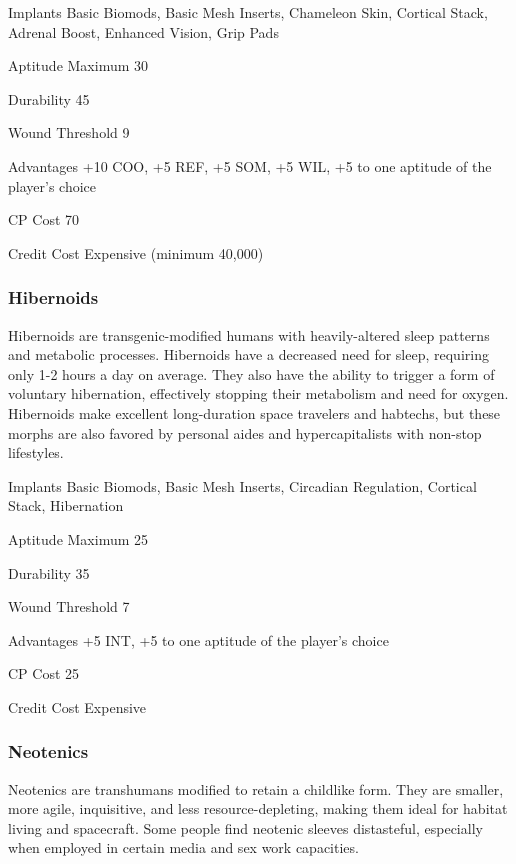 \begin{description*}
\item[Implants] Basic Biomods, Basic Mesh Inserts, Chameleon Skin, Cortical
  Stack, Adrenal Boost, Enhanced Vision, Grip Pads
\item[Aptitude Maximum] 30 
\item[Durability] 45 
\item[Wound Threshold] 9 
\item[Advantages] +10 COO, +5 REF, +5 SOM, +5 WIL, +5 to one aptitude of the
  player’s choice
\item[CP Cost] 70 
\item[Credit Cost] Expensive (minimum 40,000) 
\end{description*}

\subsubsection{Hibernoids}
Hibernoids are transgenic-modified humans with heavily-altered sleep patterns
and metabolic processes.  Hibernoids have a decreased need for sleep, requiring
only 1-2 hours a day on average. They also have the ability to trigger a form
of voluntary hibernation, effectively stopping their metabolism and need for
oxygen. Hibernoids make excellent long-duration space travelers and habtechs,
but these morphs are also favored by personal aides and hypercapitalists with
non-stop lifestyles.

\begin{description*}
\item[Implants] Basic Biomods, Basic Mesh Inserts, Circadian Regulation,
  Cortical Stack, Hibernation
\item[Aptitude Maximum] 25 
\item[Durability] 35 
\item[Wound Threshold] 7 
\item[Advantages] +5 INT, +5 to one aptitude of the player’s choice
\item[CP Cost] 25 
\item[Credit Cost] Expensive 
\end{description*}

\subsubsection{Neotenics}
Neotenics are transhumans modified to retain a childlike form. They are
smaller, more agile, inquisitive, and less resource-depleting, making them
ideal for habitat living and spacecraft. Some people find neotenic sleeves
distasteful, especially when employed in certain media and sex work capacities.


